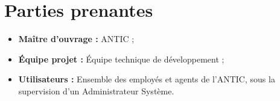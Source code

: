 \section{Parties prenantes}

\begin{itemize}
    \item \textbf{Maître d'ouvrage :} ANTIC ;
    \item \textbf{Équipe projet :} Équipe technique de développement ;
    \item \textbf{Utilisateurs :} Ensemble des employés et agents de l'ANTIC, sous la supervision d'un Administrateur Système.
\end{itemize}
